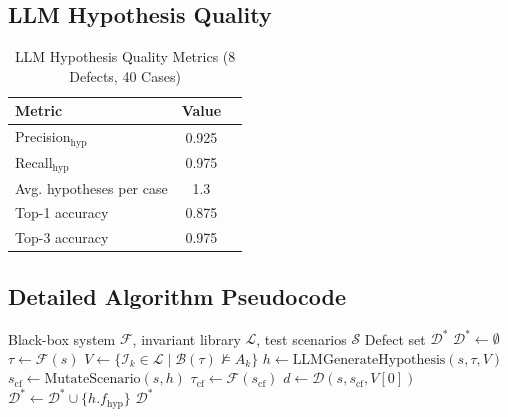 \documentclass[conference]{IEEEtran}
\theoremstyle{plain}
\newcommand{\methodname}{\textbf{CFD-Loc}}
\newcommand{\invlib}{\mathcal{L}}
\newcommand{\sys}{\mathcal{F}}
\newcommand{\beh}{\mathcal{B}}
\newcommand{\diag}{\mathcal{D}}
\begin{document}
\subsection{LLM Hypothesis Quality}
\begin{table}[h]
\centering
\caption{LLM Hypothesis Quality Metrics (8 Defects, 40 Cases)}
\label{tab:llm_quality}
\begin{tabular}{lcc}
\toprule
\textbf{Metric} & \textbf{Value}\\\midrule
Precision$_{\text{hyp}}$ & 0.925\\
Recall$_{\text{hyp}}$ & 0.975\\
Avg. hypotheses per case & 1.3\\
Top-1 accuracy & 0.875\\
Top-3 accuracy & 0.975\\
\bottomrule
\end{tabular}
\end{table}

\subsection{Detailed Algorithm Pseudocode}
\begin{algorithm}[h]
\caption{\methodname\ Full Pipeline}
\label{alg:full}
\begin{algorithmic}[1]
\Require Black-box system $\sys$, invariant library $\invlib$, test scenarios $\mathcal{S}$
\Ensure Defect set $\mathcal{D}^*$
\State $\mathcal{D}^* \gets \emptyset$
    \State $\tau \gets \sys(s)$
    \State $V \gets \{\mathcal{I}_k \in \invlib \mid \beh(\tau) \not\models A_k\}$
        \State $h \gets \text{LLMGenerateHypothesis}(s, \tau, V)$
        \State $s_{\text{cf}} \gets \text{MutateScenario}(s, h)$
        \State $\tau_{\text{cf}} \gets \sys(s_{\text{cf}})$
        \State $d \gets \diag(s, s_{\text{cf}}, V[0])$
            \State $\mathcal{D}^* \gets \mathcal{D}^* \cup \{h.f_{\text{hyp}}\}$
        \EndIf
    \EndIf
\EndFor
\State \Return $\mathcal{D}^*$
\end{algorithmic}
\end{algorithm}
\end{document}
